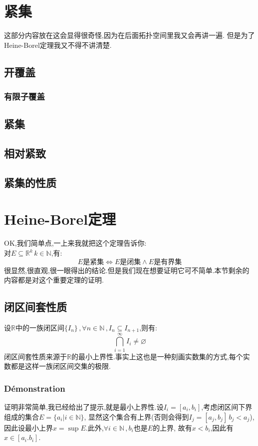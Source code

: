 \documentclass[12pt, a4paper, oneside]{ctexbook}
\newcommand{\R }{\mathbb{R}}%
\begin{document}
  \section{紧集}%
    这部分内容放在这会显得很奇怪,因为在后面拓扑空间里我又会再讲一遍.
    但是为了Heine-Borel定理我又不得不讲清楚.
  \subsection{开覆盖}
  \subsubsection{有限子覆盖}
  \subsection{紧集}
  \subsection{相对紧致}
  \subsection{紧集的性质}
\section{Heine-Borel定理}
  \noindent
  OK,我们简单点,一上来我就把这个定理告诉你:\\
  对$E\subseteq \R^k\, k\in \mathbb{N}$,有:
  $$
  E\text{是紧集}\Leftrightarrow E\text{是闭集}\land E\text{是有界集}
  $$
  很显然,很直观,很一眼得出的结论.但是我们现在想要证明它可不简单.本节剩余的内容都是对这个重要定理的证明.
  \subsection{闭区间套性质}
  设$\R$中的一族闭区间$\{I_n \}\,, \forall n\in \mathbb{N}\,,I_n\subseteq I_{n+1}$,则有:
  $$
    \bigcap_{i=1}^\infty I_i\neq \varnothing
  $$
  闭区间套性质来源于$\R$的最小上界性.事实上这也是一种刻画实数集的方式,每个实数都是这样一族闭区间交集的极限.
  \subsubsection{Démonstration}
  证明非常简单,我已经给出了提示,就是最小上界性.设$I_i=[a_i,b_i]$,考虑闭区间下界组成的集合$E=\{a_i|i\in \mathbb{N}\}$,
  显然这个集合有上界(否则会得到$I_j=[a_j,b_j]\,b_j<a_j$),因此设最小上界$x=\sup E$.此外,$\forall i\in \mathbb{N}\,,b_i$也是$E$的上界,
  故有$x<b_i$,因此有$x\in[a_i.b_i]$.
\end{document}
